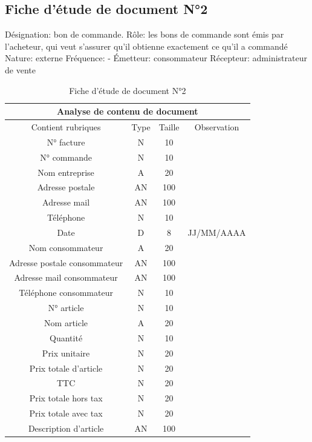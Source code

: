 \documentclass[edit,12pt,a4paper,ChapStyle,oneside,doubleinterligne]{report}
\begin{document}
\subsection{Fiche d’étude de document N°2}
\noindent Désignation: bon de commande.
\newline Rôle: les bons de commande sont émis par l’acheteur, qui veut s’assurer qu’il obtienne exactement ce qu’il a commandé
\newline Nature: externe
\newline Fréquence: -
\newline Émetteur: consommateur
\newline Récepteur: administrateur de vente \cite{Bonc}
\begin{table}[h!]
    \centering
    \begin{tabular}{|c|c|c|c|}
         \hline
\multicolumn{4}{|c|}{Analyse de contenu de document}\\
\hline
Contient rubriques & Type & Taille & Observation\\
\hline
 N° facture  & N & 10 & \\
 N° commande  & N & 10 & \\
 Nom entreprise & A & 20 & \\
 Adresse postale & AN & 100 & \\
 Adresse mail & AN & 100 & \\
 Téléphone & N & 10 & \\
Date & D & 8 & JJ/MM/AAAA \\
Nom consommateur & A & 20 & \\
Adresse postale consommateur & AN & 100 & \\
Adresse mail consommateur & AN & 100 & \\
Téléphone consommateur & N & 10 & \\
N° article & N & 10 & \\
Nom article & A & 20 & \\
Quantité & N & 10 & \\
Prix unitaire & N & 20 & \\
Prix totale d’article & N & 20 & \\
TTC & N & 20 & \\
Prix totale hors tax & N & 20 & \\
Prix totale avec tax & N & 20 & \\
Description d’article & AN & 100 & \\
\hline
    \end{tabular}
    \caption{Fiche d’étude de document N°2}
    \label{tab:2}
\end{table}
\end{document}
